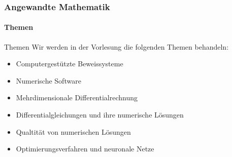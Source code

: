 \documentclass{beamer}
\begin{document}
 \begin{frame}
    \frametitle{Angewandte Mathematik}
\framesubtitle{Themen}
    \begin{block}{Themen}
        Wir werden in der Vorlesung die folgenden Themen behandeln:
        \begin{itemize}
            \item Computergestützte Beweissysteme
            \item Numerische Software
            \item Mehrdimensionale Differentialrechnung
            \item Differentialgleichungen und ihre numerische Lösungen
            \item Qualtität von numerischen Lösungen
            \item Optimierungsverfahren und neuronale Netze
        \end{itemize}
    \end{block}
 \end{frame}
\end{document}
